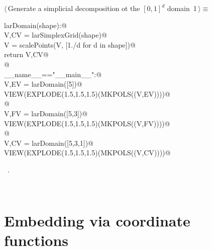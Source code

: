 \documentclass[11pt,oneside]{article}	%
\begin{document}
\begin{flushleft} \small
\begin{minipage}{\linewidth} \label{scrap1}
\protect{}$\langle\,$Generate a simplicial decomposition ot the $[0,1]^d$ domain\nobreak\ {\footnotesize 1}$\,\rangle\equiv$
\vspace{-1ex}
\begin{list}{}{} \item
\mbox{}\verb@def larDomain(shape):@\\
\mbox{}\verb@   V,CV = larSimplexGrid(shape)@\\
\mbox{}\verb@   V = scalePoints(V, [1./d for d in shape])@\\
\mbox{}\verb@   return V,CV@\\
\mbox{}\verb@   @\\
\mbox{}\verb@if __name__=="__main__":@\\
\mbox{}\verb@   V,EV = larDomain([5])@\\
\mbox{}\verb@   VIEW(EXPLODE(1.5,1.5,1.5)(MKPOLS((V,EV))))@\\
\mbox{}\verb@      @\\
\mbox{}\verb@   V,FV = larDomain([5,3])@\\
\mbox{}\verb@   VIEW(EXPLODE(1.5,1.5,1.5)(MKPOLS((V,FV))))@\\
\mbox{}\verb@      @\\
\mbox{}\verb@   V,CV = larDomain([5,3,1])@\\
\mbox{}\verb@   VIEW(EXPLODE(1.5,1.5,1.5)(MKPOLS((V,CV))))@\\
\mbox{}\verb@@{\NWsep}
\end{list}
\vspace{-1ex}
\footnotesize\addtolength{\baselineskip}{-1ex}
\begin{list}{}{\setlength{\itemsep}{-\parsep}\setlength{\itemindent}{-\leftmargin}}
\item \NWtxtMacroRefIn\ .
\end{list}
\end{minipage}\\[4ex]
\end{flushleft}

\section{Embedding via coordinate functions}
\end{document}
